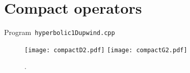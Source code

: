 \section{Compact operators}

\begin{listing}[ht!]
	\tiny
	\centering
	\caption{Program~\texttt{hyperbolic1Dupwind.cpp}}
	\label{code:hyperbolic1Dupwind.cpp}
\end{listing}

\begin{figure}[ht!]
	\centering
	\texttt{[image: compactD2.pdf]}
	\texttt{[image: compactG2.pdf]}
	\caption{.}
\end{figure}

